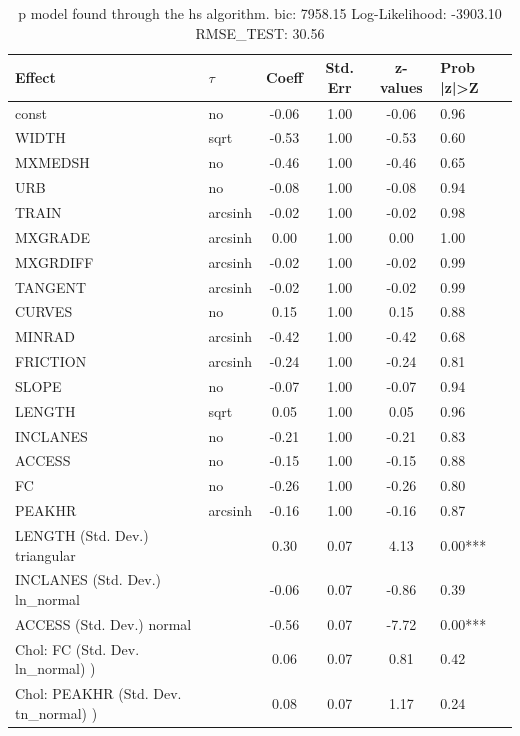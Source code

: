 \begin{table}
	\caption{p model found through the hs algorithm. bic: 7958.15 Log-Likelihood: -3903.10 RMSE_TEST: 30.56}
	\begin{center}
		\begin{tabular}{|l|l|c|c|c|l|}
			\hline
			Effect & $\tau$ & Coeff & Std. Err & z-values & Prob |z|>Z \\
			\hline
			const & no & -0.06 & 1.00 & -0.06 & 0.96 \\
			\hline
			WIDTH & sqrt & -0.53 & 1.00 & -0.53 & 0.60 \\
			\hline
			MXMEDSH & no & -0.46 & 1.00 & -0.46 & 0.65 \\
			\hline
			URB & no & -0.08 & 1.00 & -0.08 & 0.94 \\
			\hline
			TRAIN & arcsinh & -0.02 & 1.00 & -0.02 & 0.98 \\
			\hline
			MXGRADE & arcsinh & 0.00 & 1.00 & 0.00 & 1.00 \\
			\hline
			MXGRDIFF & arcsinh & -0.02 & 1.00 & -0.02 & 0.99 \\
			\hline
			TANGENT & arcsinh & -0.02 & 1.00 & -0.02 & 0.99 \\
			\hline
			CURVES & no & 0.15 & 1.00 & 0.15 & 0.88 \\
			\hline
			MINRAD & arcsinh & -0.42 & 1.00 & -0.42 & 0.68 \\
			\hline
			FRICTION & arcsinh & -0.24 & 1.00 & -0.24 & 0.81 \\
			\hline
			SLOPE & no & -0.07 & 1.00 & -0.07 & 0.94 \\
			\hline
			LENGTH & sqrt & 0.05 & 1.00 & 0.05 & 0.96 \\
			\hline
			INCLANES & no & -0.21 & 1.00 & -0.21 & 0.83 \\
			\hline
			ACCESS & no & -0.15 & 1.00 & -0.15 & 0.88 \\
			\hline
			FC & no & -0.26 & 1.00 & -0.26 & 0.80 \\
			\hline
			PEAKHR & arcsinh & -0.16 & 1.00 & -0.16 & 0.87 \\
			\hline
			LENGTH (Std. Dev.) triangular &  & 0.30 & 0.07 & 4.13 & 0.00*** \\
			\hline
			INCLANES (Std. Dev.) ln_normal &  & -0.06 & 0.07 & -0.86 & 0.39 \\
			\hline
			ACCESS (Std. Dev.) normal &  & -0.56 & 0.07 & -7.72 & 0.00*** \\
			\hline
			 Chol: FC (Std. Dev. ln_normal) ) &  & 0.06 & 0.07 & 0.81 & 0.42 \\
			\hline
			 Chol: PEAKHR (Std. Dev. tn_normal) ) &  & 0.08 & 0.07 & 1.17 & 0.24 \\

\end{tabular}
\end{center}
\end{table}
